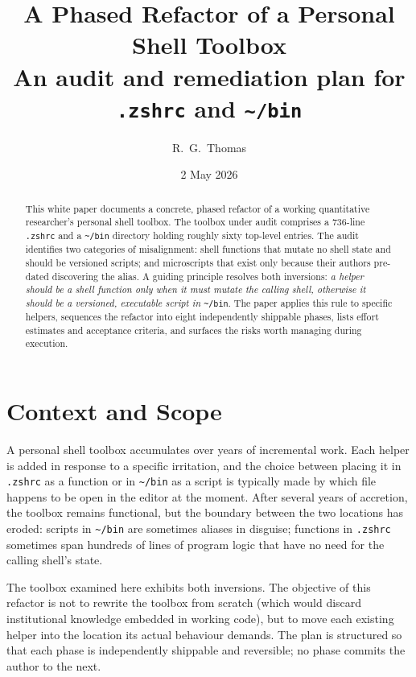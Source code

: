 \documentclass[11pt,letterpaper]{scrartcl}
\title{A Phased Refactor of a Personal Shell Toolbox\\
       \large An audit and remediation plan for
       \texttt{.zshrc} and \texttt{\textasciitilde/bin}}
\author{R.\ G.\ Thomas}
\date{2 May 2026}
\begin{document}
\maketitle

\begin{abstract}
\noindent
This white paper documents a concrete, phased refactor of a working
quantitative researcher's personal shell toolbox. The toolbox under
audit comprises a 736-line \texttt{.zshrc} and a
\texttt{\textasciitilde/bin} directory holding roughly sixty
top-level entries. The audit identifies two categories of
misalignment: shell functions that mutate no shell state and should
be versioned scripts; and microscripts that exist only because their
authors pre-dated discovering the alias. A guiding principle resolves
both inversions: \emph{a helper should be a shell function only when
it must mutate the calling shell, otherwise it should be a versioned,
executable script in} \texttt{\textasciitilde/bin}. The paper applies
this rule to specific helpers, sequences the refactor into eight
independently shippable phases, lists effort estimates and acceptance
criteria, and surfaces the risks worth managing during execution.
\end{abstract}

\tableofcontents

\section{Context and Scope}

A personal shell toolbox accumulates over years of incremental work.
Each helper is added in response to a specific irritation, and the
choice between placing it in \texttt{.zshrc} as a function or in
\texttt{\textasciitilde/bin} as a script is typically made by which
file happens to be open in the editor at the moment. After several
years of accretion, the toolbox remains functional, but the boundary
between the two locations has eroded: scripts in
\texttt{\textasciitilde/bin} are sometimes aliases in disguise;
functions in \texttt{.zshrc} sometimes span hundreds of lines of
program logic that have no need for the calling shell's state.

The toolbox examined here exhibits both inversions. The objective of
this refactor is not to rewrite the toolbox from scratch (which would
discard institutional knowledge embedded in working code), but to
move each existing helper into the location its actual behaviour
demands. The plan is structured so that each phase is independently
shippable and reversible; no phase commits the author to the next.
\end{document}
